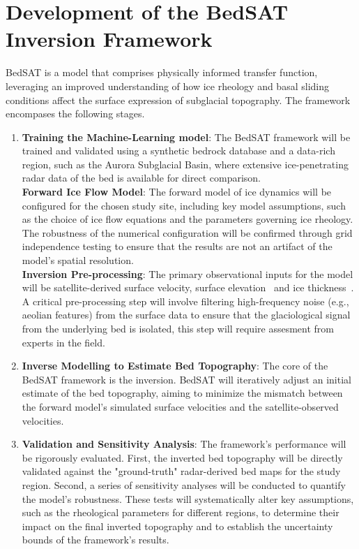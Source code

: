 \section{Development of the BedSAT Inversion Framework}
BedSAT is a model that comprises physically informed transfer function, leveraging an improved understanding of how ice rheology and basal sliding conditions affect the surface expression of subglacial topography. The framework encompases the following stages.
\begin{enumerate}
\item{\textbf{Training the Machine-Learning model}}:
The BedSAT framework will be trained and validated using a synthetic bedrock database and a data-rich region, such as the Aurora Subglacial Basin, where extensive ice-penetrating radar data of the bed is available for direct comparison.\\
\textbf{Forward Ice Flow Model}:
The forward model of ice dynamics will be configured for the chosen study site, including key model assumptions, such as the choice of ice flow equations and the parameters governing ice rheology. The robustness of the numerical configuration will be confirmed through grid independence testing to ensure that the results are not an artifact of the model's spatial resolution.\\
\textbf{Inversion Pre-processing}:
The primary observational inputs for the model will be satellite-derived surface velocity, surface elevation~\cite{itslive, REMA} and ice thickness~\cite{Young_2011, ICECAP}. A critical pre-processing step will involve filtering high-frequency noise (e.g., aeolian features) from the surface data to ensure that the glaciological signal from the underlying bed is isolated, this step will require assesment from experts in the field.
\item{\textbf{Inverse Modelling to Estimate Bed Topography}}:
The core of the BedSAT framework is the inversion. BedSAT will iteratively adjust an initial estimate of the bed topography, aiming to minimize the mismatch between the forward model's simulated surface velocities and the satellite-observed velocities.
\item{\textbf{Validation and Sensitivity Analysis}}:
The framework's performance will be rigorously evaluated. First, the inverted bed topography will be directly validated against the "ground-truth" radar-derived bed maps for the study region. Second, a series of sensitivity analyses will be conducted to quantify the model's robustness. These tests will systematically alter key assumptions, such as the rheological parameters for different regions, to determine their impact on the final inverted topography and to establish the uncertainty bounds of the framework's results.
\end{enumerate}

